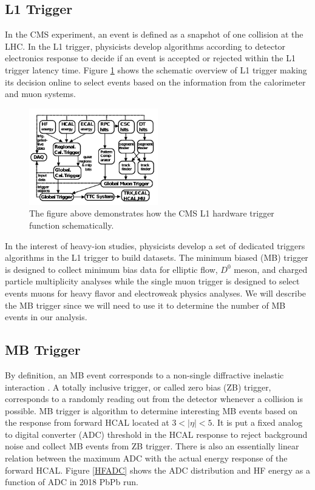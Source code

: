 \subsection{L1 Trigger}

In the CMS experiment, an event is defined as a snapshot of one collision at the LHC. In the L1 trigger, physicists develop algorithms according to detector electronics response to decide if an event is accepted or rejected within the L1 trigger latency time. Figure \ref{L1Overview} shows the schematic overview of L1 trigger making its decision online to select events based on the information from the calorimeter and muon systems.


\begin{figure}[hbtp]
\begin{center}
\includegraphics[width=0.50\textwidth]{Figures/Chapter2/L1Overview.png}
\caption{The figure above demonstrates how the CMS L1 hardware trigger function schematically.}
\label{L1Overview}
\end{center}
\end{figure} 

In the interest of heavy-ion studies, physicists develop a set of dedicated triggers algorithms in the L1 trigger to build datasets. The minimum biased (MB) trigger is designed to collect minimum bias data for elliptic flow, $D^0$ meson, and charged particle multiplicity analyses while the single muon trigger is designed to select events muons for heavy flavor and electroweak physics analyses. We will describe the MB trigger since we will need to use it to determine the number of MB events in our analysis.

\subsection{MB Trigger}

By definition, an MB event corresponds to a non-single diffractive inelastic interaction \cite{MBTrigger}. A totally inclusive trigger, or called zero bias (ZB) trigger, corresponds to a randomly reading out from the detector whenever a collision is possible. MB trigger is algorithm to determine interesting MB events based on the response from forward HCAL located at $3 < |\eta| < 5$. It is put a fixed analog to digital converter (ADC) threshold in the HCAL response to reject background noise and collect MB events from ZB trigger. There is also an essentially linear relation between the maximum ADC with the actual energy response of the forward HCAL. Figure \ref{HFADC} shows the ADC distribution and HF energy as a function of ADC in 2018 PbPb run.

